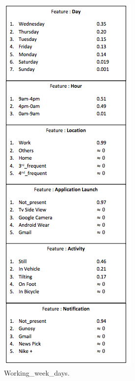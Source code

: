 \begin{figure}[t!]
\begin{subfigure}[t]{0.33\textwidth}
        \includegraphics[scale=0.5]{Figures/Work.png}
        \caption{Working\_week\_days.}
    \end{subfigure}%
  \begin{subfigure}[t]{0.33\textwidth}
        \centering

\end{subfigure}
\end{figure}
